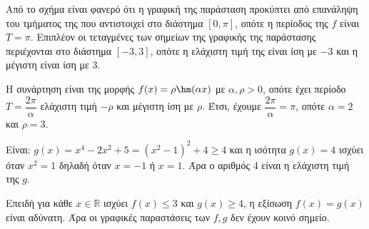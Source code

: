 \begin{alist}
\item Από το σχήμα είναι φανερό ότι η γραφική της παράσταση προκύπτει από επανάληψη του τμήματος της που αντιστοιχεί στο διάστημα $[0, \pi]$, οπότε η περίοδος της $f$ είναι $T = \pi$.
Επιπλέον οι τεταγμένες των σημείων της γραφικής της παράστασης περιέχονται στο διάστημα $[-3, 3]$, οπότε η ελάχιστη τιμή της είναι ίση με $-3$ και η μέγιστη είναι ίση με 3.
\item Η συνάρτηση είναι της μορφής $f(x) = \rho\hm (\alpha x)$ με $\alpha, \rho > 0$, οπότε έχει περίοδο $T = \dfrac{2\pi}{\alpha}$ ελάχιστη τιμή $-\rho$ και μέγιστη ίση με $\rho$. Έτσι, έχουμε $\dfrac{2\pi}{\alpha} = \pi$, οπότε $\alpha = 2$ και $\rho = 3$.
\item Είναι: $g(x) = x^4 - 2x^2 + 5 = (x^2 - 1)^2 + 4 \ge 4$ και η ισότητα $g(x) = 4$ ισχύει όταν $x^2 = 1$ δηλαδή όταν $x = -1$ ή $x = 1$. Άρα ο αριθμός 4 είναι η ελάχιστη τιμή της $g$.
\item Επειδή για κάθε $x \in \mathbb{R}$ ισχύει $f(x) \le 3$ και $g(x) \ge 4$, η εξίσωση $f(x) = g(x)$ είναι αδύνατη. Άρα οι γραφικές παραστάσεις των $f, g$ δεν έχουν κοινό σημείο.
\end{alist}

